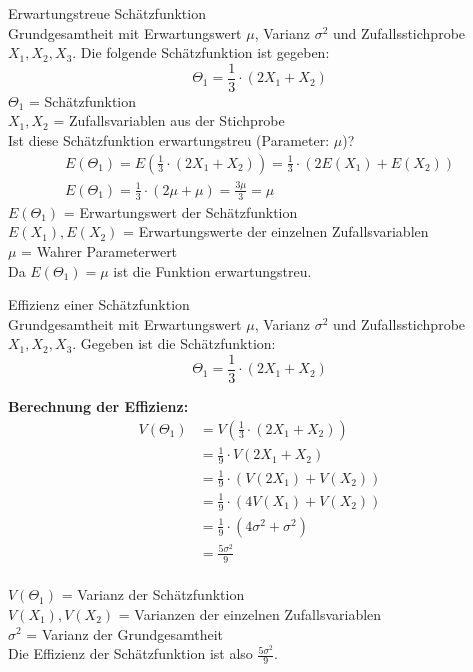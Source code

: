 \begin{example2}{Erwartungstreue Schätzfunktion}\\
Grundgesamtheit mit Erwartungswert $\mu$, Varianz $\sigma^2$ und Zufallsstichprobe $X_1, X_2, X_3$. Die folgende Schätzfunktion ist gegeben:
$$
\Theta_1=\frac{1}{3} \cdot(2X_1+X_2)
$$
$\Theta_1$ = Schätzfunktion\\
$X_1, X_2$ = Zufallsvariablen aus der Stichprobe\\

Ist diese Schätzfunktion erwartungstreu (Parameter: $\mu$)?
$$
\begin{gathered}
E(\Theta_1)=E(\frac{1}{3} \cdot(2X_1+X_2))=\frac{1}{3} \cdot(2E(X_1)+E(X_2)) \\
E(\Theta_1)=\frac{1}{3} \cdot(2\mu+\mu)=\frac{3\mu}{3}=\mu
\end{gathered}
$$
$E(\Theta_1)$ = Erwartungswert der Schätzfunktion\\
$E(X_1), E(X_2)$ = Erwartungswerte der einzelnen Zufallsvariablen\\
$\mu$ = Wahrer Parameterwert\\

Da $E(\Theta_1)=\mu$ ist die Funktion erwartungstreu.
\end{example2}

\begin{example2}{Effizienz einer Schätzfunktion}\\
Grundgesamtheit mit Erwartungswert $\mu$, Varianz $\sigma^2$ und Zufallsstichprobe $X_1, X_2, X_3$. Gegeben ist die Schätzfunktion:
$$
\Theta_1=\frac{1}{3} \cdot(2X_1+X_2)
$$

\textbf{Berechnung der Effizienz:}
$$
\begin{aligned}
V(\Theta_1) &= V(\frac{1}{3} \cdot(2X_1+X_2)) \\
&= \frac{1}{9} \cdot V(2X_1+X_2) \\
&= \frac{1}{9} \cdot (V(2X_1) + V(X_2)) \\
&= \frac{1}{9} \cdot (4V(X_1) + V(X_2)) \\
&= \frac{1}{9} \cdot (4\sigma^2 + \sigma^2) \\
&= \frac{5\sigma^2}{9}
\end{aligned}
$$
\\
$V(\Theta_1)$ = Varianz der Schätzfunktion\\
$V(X_1), V(X_2)$ = Varianzen der einzelnen Zufallsvariablen\\
$\sigma^2$ = Varianz der Grundgesamtheit\\

Die Effizienz der Schätzfunktion ist also $\frac{5\sigma^2}{9}$.
\end{example2}

